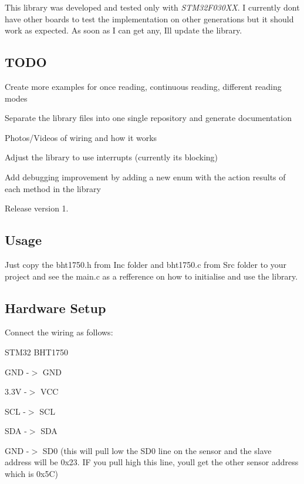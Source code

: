 This library was developed and tested only with {\itshape S\+T\+M32\+F030\+XX}. I currently don\textquotesingle{}t have other boards to test the implementation on other generations but it should work as expected. As soon as I can get any, I\textquotesingle{}ll update the library.

\subsection*{T\+O\+DO}


\begin{DoxyItemize}
\item Create more examples for once reading, continuous reading, different reading modes
\item Separate the library files into one single repository and generate documentation
\item Photos/\+Videos of wiring and how it works
\item Adjust the library to use interrupts (currently it\textquotesingle{}s blocking)
\item Add debugging improvement by adding a new enum with the action results of each method in the library
\item Release version 1.
\end{DoxyItemize}

\subsection*{Usage}

Just copy the {\ttfamily bht1750.\+h} from Inc folder and {\ttfamily bht1750.\+c} from Src folder to your project and see the {\ttfamily main.\+c} as a refference on how to initialise and use the library.

\subsection*{Hardware Setup}

Connect the wiring as follows\+:

S\+T\+M32 B\+H\+T1750

G\+ND -\/$>$ G\+ND

3.\+3V -\/$>$ V\+CC

S\+CL -\/$>$ S\+CL

S\+DA -\/$>$ S\+DA

G\+ND -\/$>$ S\+D0 (this will pull low the S\+D0 line on the sensor and the slave address will be 0x23. IF you pull high this line, you\textquotesingle{}ll get the other sensor address which is 0x5C)

